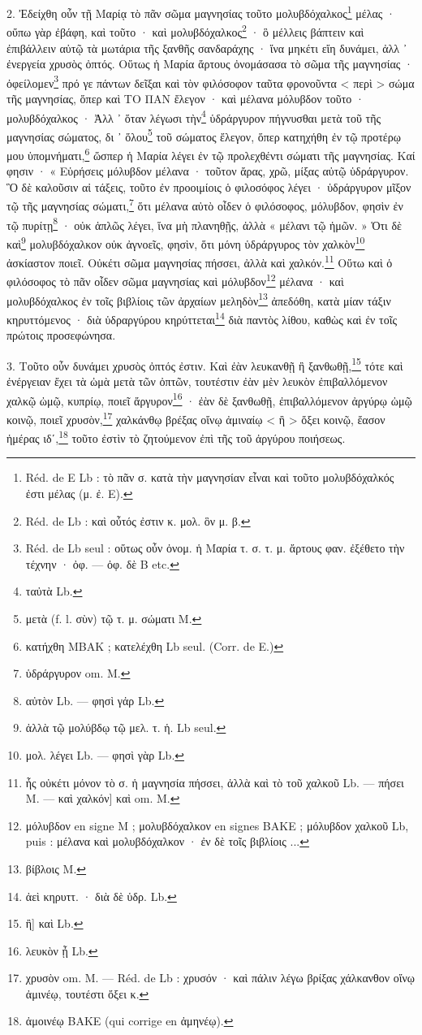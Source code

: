 \documentclass[a4paper, 11pt, oneside, polutonikogreek, french]{article}
\begin{document}
2. Ἐδείχθη οὖν τῇ Μαρίᾳ τὸ πᾶν σῶμα μαγνησίας τοῦτο μολυβδόχαλκος\footnote{Réd. de E Lb : τὸ πᾶν σ. κατὰ τὴν μαγνησίαν εἶναι καὶ τοῦτο μολυβδόχαλκός ἐστι μέλας (μ. ἐ. E).} μέλας · οὔπω γὰρ ἐβάφη, καὶ τοῦτο · καὶ μολυβδόχαλκος\footnote{Réd. de Lb : καὶ οὖτός ἐστιν κ. μολ. ὃν μ. β.} · ὃ μέλλεις βάπτειν καὶ ἐπιβάλλειν αὐτῷ τὰ μωτάρια τῆς ξανθῆς σανδαράχης · ἵνα μηκέτι εἴη δυνάμει, ἀλλ ᾽ ἐνεργεία χρυσὸς ὀπτός. Οὕτως ἡ Μαρία ἄρτους ὀνομάσασα τὸ σῶμα τῆς μαγνησίας · ὀφείλομεν\footnote{Réd. de Lb seul : οὕτως οὖν ὀνομ. ἡ Μαρία τ. σ. τ. μ. ἄρτους φαν. ἐξέθετο τὴν τέχνην · ὀφ. --- ὀφ. δὲ B etc.} πρό γε πάντων δεῖξαι καὶ τὸν φιλόσοφον ταῦτα φρονοῦντα < περὶ > σώμα τῆς μαγνησίας, ὅπερ καὶ ΤΟ ΠΑΝ ἔλεγον · καὶ μέλανα μόλυβδον τοῦτο · μολυβδόχαλκος · Ἀλλ ᾽ ὅταν λέγωσι τὴν\footnote{ταὐτὰ Lb.} ὑδράργυρον πήγνυσθαι μετὰ τοῦ τῆς μαγνησίας σώματος, δι ᾽ ὅλου\footnote{μετὰ (f. l. σὺν) τῷ τ. μ. σώματι M.} τοῦ σώματος ἔλεγον, ὅπερ κατηχήθη ἐν τῷ προτέρῳ μου ὑπομνήματι,\footnote{κατήχθη MBAK ; κατελέχθη Lb seul. (Corr. de E.)} ὥσπερ ἡ Μαρία λέγει ἐν τῷ προλεχθέντι σώματι τῆς μαγνησίας. Καί φησιν · « Εὑρήσεις μόλυβδον μέλανα · τοῦτον ἄρας, χρῶ, μίξας αὐτῷ ὑδράργυρον. Ὃ δὲ καλοῦσιν αἰ τάξεις, τοῦτο ἐν προοιμίοις ὁ φιλοσόφος λέγει · ὑδράργυρον μῖξον τῷ τῆς μαγνησίας σώματι,\footnote{ὑδράργυρον om. M.} ὅτι μέλανα αὐτὸ οἶδεν ὁ φιλόσοφος, μόλυβδον, φησὶν ἐν τῷ πυρίτῃ\footnote{αὐτὸν Lb. --- φησὶ γἀρ Lb.} · οὐκ ἁπλῶς λέγει, ἵνα μὴ πλανηθῇς, ἀλλὰ « μέλανι τῷ ἡμῶν. » Ὁτι δὲ καὶ\footnote{ἀλλὰ τῷ μολύβδῳ τῷ μελ. τ. ἡ. Lb seul.} μολυβδόχαλκον οὐκ ἀγνοεῖς, φησὶν, ὅτι μόνη ὑδράργυρος τὸν χαλκὸν\footnote{μολ. λέγει Lb. --- φησὶ γὰρ Lb.} ἀσκίαστον ποιεῖ. Οὐκέτι σῶμα μαγνησίας πήσσει, ἀλλὰ καὶ χαλκόν.\footnote{ἧς οὐκέτι μόνον τὸ σ. ἡ μαγνησία πήσσει, ἀλλὰ καὶ τὸ τοῦ χαλκοῦ Lb. --- πήσει M. --- καὶ χαλκόν] καὶ om. M.} Οὕτω καὶ ὁ φιλόσοφος τὸ πᾶν οἶδεν σῶμα μαγνησίας καὶ μόλυβδον\footnote{μόλυβδον en signe M ; μολυβδόχαλκον en signes BAKE ; μόλυβδον χαλκοῦ Lb, puis : μέλανα καὶ μολυβδόχαλκον · ἐν δὲ τοῖς βιβλίοις ...} μέλανα · καὶ μολυβδόχαλκος ἐν τοῖς βιβλίοις τῶν ἀρχαίων μεληδὸν\footnote{βίβλοις M.} ἀπεδόθη, κατὰ μίαν τάξιν κηρυττόμενος · διὰ ὑδραργύρου κηρύττεται\footnote{ἀεὶ κηρυττ. · διὰ δὲ ὑδρ. Lb.} διὰ παντὸς λίθου, καθὼς καὶ ἐν τοῖς πρώτοις προσεφώνησα.

3. Τοῦτο οὖν δυνάμει χρυσὸς ὀπτός ἐστιν. Καὶ ἐὰν λευκανθῇ ἢ ξανθωθῇ,\footnote{ἢ] καὶ Lb.} τότε καὶ ἐνέργειαν ἔχει τὰ ὠμὰ μετὰ τῶν ὀπτῶν, τουτέστιν ἐὰν μὲν λευκὸν ἐπιβαλλόμενον χαλκῷ ὠμῷ, κυπρίῳ, ποιεῖ ἄργυρον\footnote{λευκὸν ᾖ Lb.} · ἐὰν δὲ ξανθωθῇ, ἐπιβαλλόμενον ἀργύρῳ ὠμῷ κοινῷ, ποιεῖ χρυσὸν,\footnote{χρυσὸν om. M. --- Réd. de Lb : χρυσόν · καὶ πάλιν λέγω βρίξας χάλκανθον οἴνῳ ἀμινέῳ, τουτέστι ὄξει κ.} χαλκάνθῳ βρέξας οἴνῳ ἀμιναίῳ < ἢ > ὄξει κοινῷ, ἔασον ἡμέρας ιδʹ,\footnote{ἀμοινέῳ BAKE (qui corrige en ἀμηνέῳ).} τοῦτο ἐστὶν τὸ ζητούμενον ἐπὶ τῆς τοῦ ἀργύρου ποιήσεως.
\end{document}
